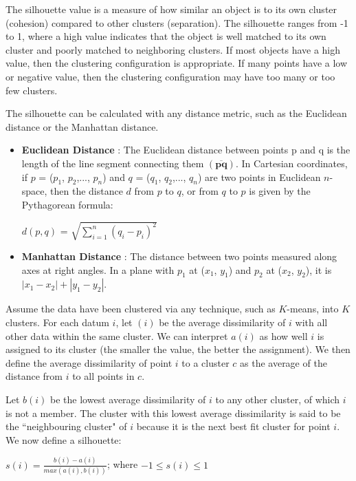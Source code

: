 The silhouette value is a measure of how similar an object is to its own cluster (cohesion) compared to other
clusters (separation). The silhouette ranges from -1 to 1, where a high value indicates that the object is well
matched to its own cluster and poorly matched to neighboring clusters. If most objects have a high value, then
the clustering configuration is appropriate. If many points have a low or negative value, then the clustering
configuration may have too many or too few clusters.

The silhouette can be calculated with any distance metric, such as the Euclidean distance or the Manhattan distance.

\begin{itemize}
\item \textbf{Euclidean Distance} : The Euclidean distance between points p and q is the length of the line segment
connecting them $(\overline{\mathbf{p}\mathbf{q}})$. In Cartesian coordinates, if $p$ = ($p_1$, $p_2$,..., $p_n$) and $q$ = ($q_1$, $q_2$,..., $q_n$) are two points in Euclidean $n$-space,
then the distance $d$ from $p$ to $q$, or from $q$ to $p$ is given by the Pythagorean formula:

$d(p, q)$ = $\sqrt{\sum_{i=1}^{n}(q_i-p_i)^2}$

\item \textbf{Manhattan Distance} : The distance between two points measured along axes at right angles.
In a plane with $p_1$ at ($x_1$, $y_1$) and $p_2$ at ($x_2$, $y_2$), it is $|x_1 - x_2| + |y_1 - y_2|$.
\end{itemize}

Assume the data have been clustered via any technique, such as $K$-means, into $K$ clusters.
For each datum $i$, let $(i)$ be the average dissimilarity of $i$ with all other data within
the same cluster. We can interpret $a(i)$ as how well $i$ is assigned to its cluster (the
smaller the value, the better the assignment). We then define the average dissimilarity of
point $i$ to a cluster $c$ as the average of the distance from $i$ to all points in $c$.

Let $b(i)$ be the lowest average dissimilarity of $i$ to any other cluster, of which $i$ is
not a member. The cluster with this lowest average dissimilarity is said to be the ``neighbouring
cluster" of $i$ because it is the next best fit cluster for point $i$. We now define a silhouette:

$s(i) = \frac{b(i) - a(i)}{max(a(i), b(i))}$; where $-1\leq{s(i)}\leq{1}$

